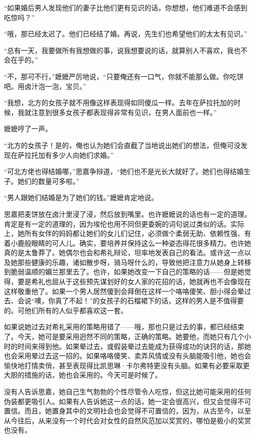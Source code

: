 \par “如果婚后男人发现他们的妻子比他们更有见识的话，你想想，他们难道不会感到吃惊吗？”
\par “哦，那已经太迟了。他们已经结了婚。再说，先生们也希望他们的太太有见识。”
\par “总有一天，我要做所有我想做的事，说我想要说的话，就算别人不喜欢，我也不会在乎的。”
\par “不，那可不行，”嬷嬷严厉地说，“只要俺还有一口气，你就不能那么做。你吃饼吧。用卤汁泡一泡，宝贝。”
\par “我想，北方的女孩子就不用像这样表现得如同傻瓜一样。去年在萨拉托加的时候，我就注意到很多女孩子都表现得非常有见识，在男人面前也一样。”
\par 嬷嬷哼了一声。
\par “北方的女孩子！是的，俺也认为她们会直截了当地说出她们的想法，但俺可没发现在萨拉托加有多少人向她们求婚。”
\par “可北方佬也得结婚哪，”思嘉争辩道，“她们也不是光长大就好了。她们也得结婚生子。她们的数量可多啦。”
\par “男人跟她们结婚是为了她们的钱。”嬷嬷肯定地说。
\par 思嘉把麦饼放在卤汁里浸了浸，然后放到嘴里。也许嬷嬷说的话也有一定的道理。肯定是有一定的道理的，因为埃伦也用不同但更委婉的词句说过类似的话。实际上，她所有女伴的妈妈都让她们的女儿们记住，必须做个柔弱无助、依赖性强、有着小鹿般眼睛的可人儿。确实，要培养并保持这么一种姿态得花很多精力。也许她真的是太鲁莽了。她偶尔也会和希礼辩论，坦率地发表自己的看法。或许这一点以及她那些健康的乐趣，诸如散步呀，骑马呀什么的，导致他把注意力从她身上转移到脆弱温顺的媚兰那里去了。也许，如果她改变一下自己的策略的话——但是她觉得，要是希礼也屈从于这些预先谋划好的女人家的花招的话，她就再也不会像现在这样敬重他了。如果一个男人居然傻到会拜倒在这样一个咯咯傻笑、胆小得会晕过去、会说“噢，你真了不起！”的女孩子的石榴裙下的话，这样的男人是不值得要的。可他们所有的人似乎都喜欢这一套。
\par 如果说她过去对希礼采用的策略用错了——哦，那也只是过去的事，都已经结束了。今天，她可是要采用迥然不同的策略，正确的策略。她要他，而她只有几个小时的时间来得到他。如果晕过去，或假装晕过去能成为获得成功的诀窍的话，那她也会采用晕过去这一招的。如果咯咯傻笑、卖弄风情或没有头脑能吸引他，她也会愉快地打情卖俏，甚至表现得比凯思琳·卡尔弗特更没有头脑。如果有必要采取更大胆的措施的话，她也会采用的。今天可是时候了。
\par 没有人告诉思嘉，她自己生气勃勃的个性尽管令人吃惊，但这比她可能采用的任何伪装都更吸引人。如果有人告诉她这一点的话，她一定会很高兴，但又会觉得不可置信。而且，她置身其中的文明社会也会觉得不可置信的，因为，从古至今，以至从今往后，从来没有一个时代会对女性的自然风范加以奖赏的，哪怕是极小的奖赏也没有。

